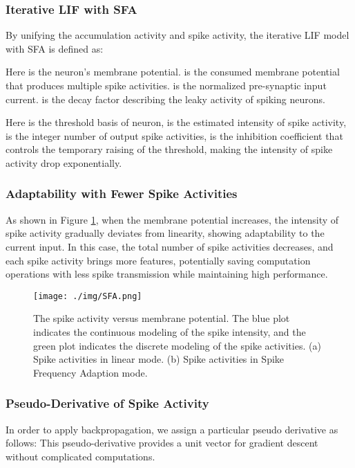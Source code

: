 \documentclass{article}
\begin{document}
\subsubsection{Iterative LIF with SFA}
By unifying the accumulation activity and spike activity, the iterative LIF model with SFA is defined as:

Here  is the neuron's membrane potential.  is the consumed membrane potential that produces multiple spike activities.  is the normalized pre-synaptic input current.  is the decay factor describing the leaky activity of spiking neurons.





Here  is the threshold basis  of neuron,  is the estimated intensity of spike activity,  is the integer number of output spike activities,  is the inhibition coefficient that controls the temporary raising of the threshold, making the intensity of spike activity drop exponentially. 

\subsubsection{Adaptability with Fewer Spike Activities}
As shown in Figure \ref{fig:s_curve}, when the membrane potential  increases, the intensity of spike activity gradually deviates from linearity, showing adaptability to the current input. In this case, the total number of spike activities decreases, and each spike activity brings more features, potentially saving computation operations with less spike transmission while maintaining high performance.




\begin{figure}[htbp]
    \centering
\texttt{[image: ./img/SFA.png]}
    \caption{The spike activity versus membrane potential. The blue plot indicates the continuous modeling of the spike intensity, and the green plot indicates the discrete modeling of the spike activities. (a) Spike activities in linear mode. (b) Spike activities in Spike Frequency Adaption mode.}
    \label{fig:s_curve}
\end{figure}






\subsubsection{Pseudo-Derivative of Spike Activity}
In order to apply backpropagation, we assign a particular pseudo derivative as follows:
This pseudo-derivative provides a unit vector for gradient descent without complicated computations.
\end{document}
